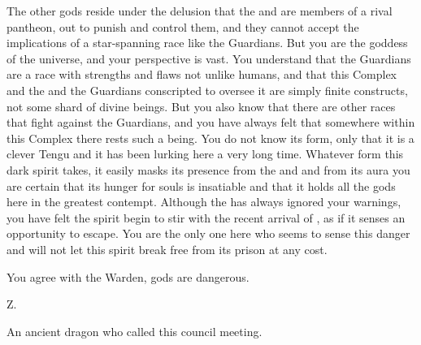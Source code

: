 \documentclass[char]{guardians}
\begin{document}
The other gods reside under the delusion that the \cCaretaker{} and \cWarden{} are members of a rival pantheon, out to punish and control them, and they cannot accept the implications of a star-spanning race like the Guardians. But you are the goddess of the universe, and your perspective is vast. You understand that the Guardians are a race with strengths and flaws not unlike humans, and that this Complex and the \cCaretaker{} and \cWarden{} the Guardians conscripted to oversee it are simply finite constructs, not some shard of divine beings. But you also know that there are other races that fight against the Guardians, and you have always felt that somewhere within this Complex there rests such a being. You do not know its form, only that it is a clever Tengu and it has been lurking here a very long time. Whatever form this dark spirit takes, it easily masks its presence from the \cWarden{} and \cCaretaker{} and from its aura you are certain that its hunger for souls is insatiable and that it holds all the gods here in the greatest contempt. Although the \cWarden{} has always ignored your warnings, you have felt the spirit begin to stir with the recent arrival of \cUnity{}, as if it senses an opportunity to escape. You are the only one here who seems to sense this danger and will not let this spirit break free from its prison at any cost.

You agree with the Warden, gods are dangerous.

\begin{itemz}[Goals]
  \item Z.
\end{itemz}


\begin{contacts}
  \contact{\cCaretaker{}} An ancient dragon who called this council meeting.
\end{contacts}
\end{document}
